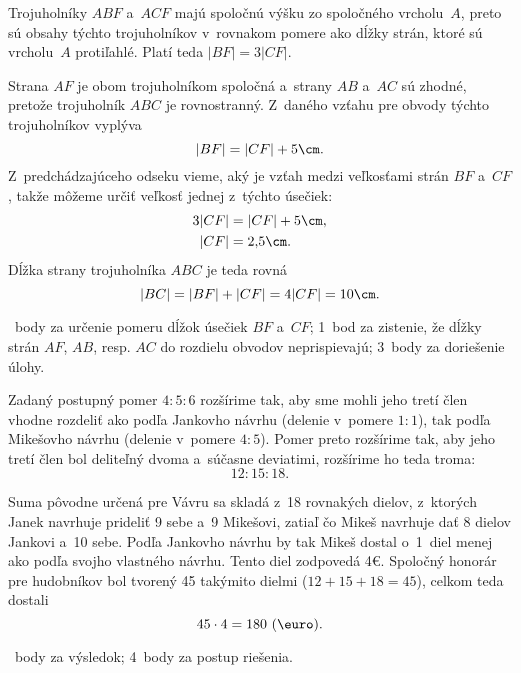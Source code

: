 {%
Trojuholníky $ABF$ a~$ACF$ majú spoločnú výšku zo spoločného vrcholu~$A$,
preto sú obsahy týchto trojuholníkov v~rovnakom pomere ako dĺžky strán,
ktoré sú vrcholu~$A$ protiľahlé.
Platí teda $|BF|=3|CF|$.
%

Strana $AF$ je obom trojuholníkom spoločná a~strany $AB$ a~$AC$ sú
zhodné, pretože trojuholník $ABC$ je rovnostranný.
Z~daného vzťahu pre obvody týchto trojuholníkov vyplýva
$$
|BF|=|CF|+5\cm.
$$
Z~predchádzajúceho odseku vieme, aký je vzťah medzi veľkosťami strán $BF$
a~$CF$, takže môžeme určiť veľkosť jednej z~týchto úsečiek:
$$
\aligned
3|CF|&=|CF|+5\cm,\\
|CF|&=2{,}5\cm.
\endaligned
$$
Dĺžka strany trojuholníka $ABC$ je teda rovná
$$
|BC|=|BF|+|CF|=4|CF|=10\cm.
$$

~body za určenie pomeru dĺžok úsečiek $BF$ a~$CF$;
1~bod za zistenie, že dĺžky strán $AF$, $AB$, resp. $AC$ do rozdielu obvodov neprispievajú;
3~body za doriešenie úlohy.
\endhodnotenie
}

{%
Zadaný postupný pomer $4:5:6$ rozšírime tak, aby sme mohli jeho tretí člen
vhodne rozdeliť ako podľa Jankovho návrhu (delenie v~pomere $1:1$), tak podľa
Mikešovho návrhu (delenie v~pomere $4:5$).
Pomer preto rozšírime tak, aby jeho tretí člen bol deliteľný dvoma a~súčasne
deviatimi, rozšírime ho teda troma:
$$
12:15:18.
$$

Suma pôvodne určená pre Vávru sa skladá z~18 rovnakých dielov, z~ktorých Janek
navrhuje prideliť 9 sebe a~9 Mikešovi, zatiaľ čo Mikeš navrhuje dať 8 dielov Jankovi
a~10 sebe.
Podľa Jankovho návrhu by tak Mikeš dostal o~1~diel menej ako podľa svojho vlastného návrhu.
Tento diel zodpovedá 4€.
Spoločný honorár pre hudobníkov bol tvorený 45 takýmito dielmi ($12+15+18=45$), celkom teda dostali
$$
45\cdot4=180\ (\text{\euro}).
$$

~body za výsledok; 4~body za postup riešenia.
\endhodnotenie
}

